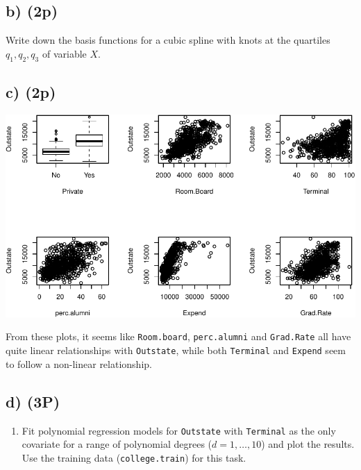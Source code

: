\documentclass[]{article}
\providecommand{\tightlist}{%
  \setlength{\itemsep}{0pt}\setlength{\parskip}{0pt}}
\begin{document}
\hypertarget{b-2p-1}{%
\subsection{b) (2p)}\label{b-2p-1}}

Write down the basis functions for a cubic spline with knots at the
quartiles \(q_1, q_2, q_3\) of variable \(X\).

\hypertarget{c-2p}{%
\subsection{c) (2p)}\label{c-2p}}

\begin{center}\includegraphics{Compulsory2_Group37_StatLearn_files/figure-latex/2c3-1} \end{center}

From these plots, it seems like \texttt{Room.board},
\texttt{perc.alumni} and \texttt{Grad.Rate} all have quite linear
relationships with \texttt{Outstate}, while both \texttt{Terminal} and
\texttt{Expend} seem to follow a non-linear relationship.

\hypertarget{d-3p}{%
\subsection{d) (3P)}\label{d-3p}}

\begin{enumerate}
\def\labelenumi{(\roman{enumi})}
\tightlist
\item
  Fit polynomial regression models for \texttt{Outstate} with
  \texttt{Terminal} as the only covariate for a range of polynomial
  degrees (\(d = 1,\ldots,10\)) and plot the results. Use the training
  data (\texttt{college.train}) for this task.
\end{enumerate}
\end{document}
